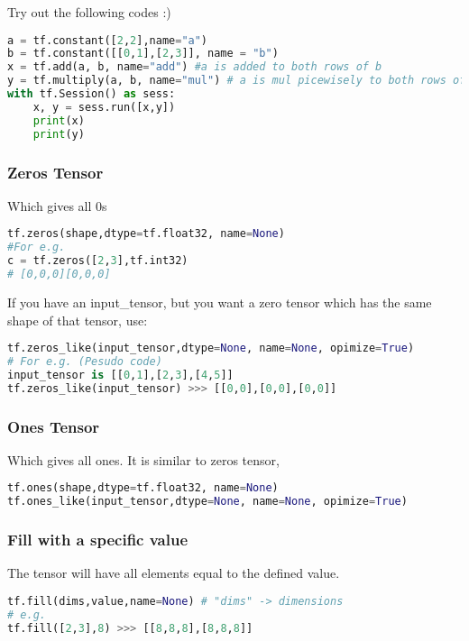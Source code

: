 \documentclass{article}
\begin{document}
	\noindent Try out the following codes :)
\begin{lstlisting}[language=Python,morekeywords ={as}]
a = tf.constant([2,2],name="a")
b = tf.constant([[0,1],[2,3]], name = "b")
x = tf.add(a, b, name="add") #a is added to both rows of b
y = tf.multiply(a, b, name="mul") # a is mul picewisely to both rows of b
with tf.Session() as sess:
    x, y = sess.run([x,y])
    print(x)
    print(y)
\end{lstlisting}
	\medskip
	\subsubsection{Zeros Tensor}
	Which gives all 0s
\begin{lstlisting}[numbers=none,language=Python,morekeywords ={as}]
tf.zeros(shape,dtype=tf.float32, name=None)
#For e.g.
c = tf.zeros([2,3],tf.int32)
# [0,0,0][0,0,0]
\end{lstlisting}
	If you have an input\_tensor, but you want a zero tensor which has the same shape of that tensor, use:
\begin{lstlisting}[numbers=none,language=Python,morekeywords ={as}]
tf.zeros_like(input_tensor,dtype=None, name=None, opimize=True)
# For e.g. (Pesudo code)
input_tensor is [[0,1],[2,3],[4,5]]
tf.zeros_like(input_tensor) >>> [[0,0],[0,0],[0,0]]
\end{lstlisting}	

	\subsubsection{Ones Tensor}
	Which gives all ones. It is similar to zeros tensor,
\begin{lstlisting}[numbers=none,language=Python,morekeywords ={as}]
tf.ones(shape,dtype=tf.float32, name=None)
tf.ones_like(input_tensor,dtype=None, name=None, opimize=True)
\end{lstlisting}
	\subsubsection{Fill with a specific value} 
	The tensor will have all elements equal to the defined value.
\begin{lstlisting}[numbers=none,language=Python,morekeywords ={as}]
tf.fill(dims,value,name=None) # "dims" -> dimensions
# e.g.
tf.fill([2,3],8) >>> [[8,8,8],[8,8,8]]
\end{lstlisting}
\end{document}
